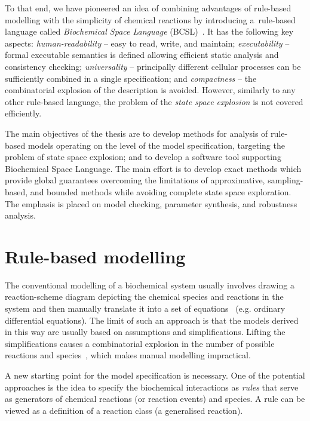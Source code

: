 \documentclass[11pt,a4paper]{report}
\begin{document}
To that end, we have pioneered an idea of combining advantages of rule-based modelling with the simplicity of chemical reactions by introducing a~rule-based language called \emph{Biochemical Space Language} (BCSL)~\cite{dved2016formal}. It has the following key aspects: \emph{human-readability} -- easy to read, write, and maintain;
\emph{executability} -- formal executable semantics is defined allowing efficient static analysis and consistency checking; \emph{universality} -- principally different cellular processes can be sufficiently combined in a single specification; and \emph{compactness} -- the combinatorial explosion of the description is avoided. However, similarly to any other rule-based language, the problem of the \emph{state space explosion} is not covered efficiently.

The main objectives of the thesis are to develop methods for analysis of rule-based models operating on the level of the model specification, targeting the problem of state space explosion; and to develop a software tool supporting Biochemical Space Language. The main effort is to develop exact methods which provide global guarantees overcoming the limitations of approximative, sampling-based, and bounded methods while avoiding complete state space exploration. The emphasis is placed on model checking, parameter synthesis, and robustness analysis.

\chapter{Rule-based modelling}
\label{formal}

The conventional modelling of a biochemical system usually involves drawing a reaction-scheme diagram depicting the chemical species and reactions in the system and then manually translate it into a set of equations~\cite{voit2000computational} (e.g. ordinary differential equations). The limit of such an approach is that the models derived in this way are usually based on assumptions and simplifications. Lifting the simplifications causes a combinatorial explosion in the number of possible reactions and species~\cite{blinov2006network}, which makes manual modelling impractical.

A new starting point for the model specification is necessary. One of the potential approaches is the idea to specify the biochemical interactions as \emph{rules} that serve as generators of chemical reactions (or reaction events) and species. A rule can be viewed as a definition of a reaction class (a generalised reaction).
\end{document}

